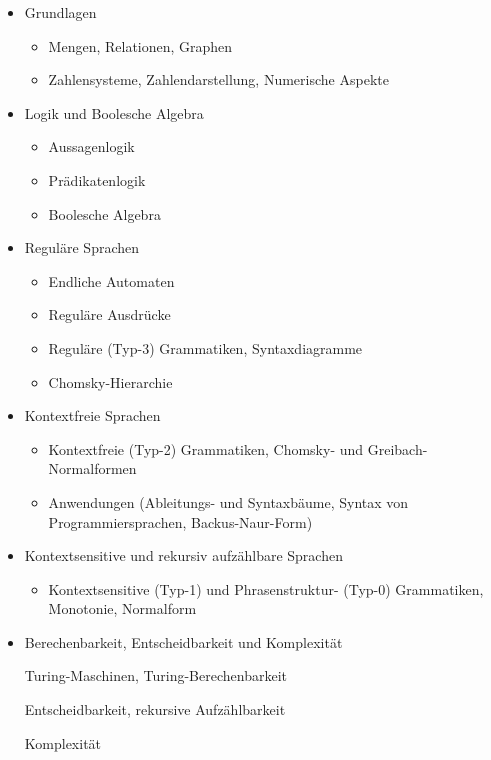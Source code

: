 \begin{itemize}
\tightlist
\item
  Grundlagen

  \begin{itemize}
\tightlist
\item
    Mengen, Relationen, Graphen
  \item
    Zahlensysteme, Zahlendarstellung, Numerische Aspekte
  \end{itemize}
\item
  Logik und Boolesche Algebra

  \begin{itemize}
\tightlist
\item
    Aussagenlogik
  \item
    Prädikatenlogik
  \item
    Boolesche Algebra
  \end{itemize}
\item
  Reguläre Sprachen

  \begin{itemize}
\tightlist
\item
    Endliche Automaten
  \item
    Reguläre Ausdrücke
  \item
    Reguläre (Typ-3) Grammatiken, Syntaxdiagramme
  \item
    Chomsky-Hierarchie
  \end{itemize}
\item
  Kontextfreie Sprachen

  \begin{itemize}
\tightlist
\item
    Kontextfreie (Typ-2) Grammatiken, Chomsky- und Greibach-Normalformen
  \item
    Anwendungen (Ableitungs- und Syntaxbäume, Syntax von
    Programmiersprachen, Backus-Naur-Form)
  \end{itemize}
\item
  Kontextsensitive und rekursiv aufzählbare Sprachen

  \begin{itemize}
\tightlist
\item
    Kontextsensitive (Typ-1) und Phrasenstruktur- (Typ-0) Grammatiken,
    Monotonie, Normalform
  \end{itemize}
\item
  Berechenbarkeit, Entscheidbarkeit und Komplexität

  Turing-Maschinen, Turing-Berechenbarkeit

  Entscheidbarkeit, rekursive Aufzählbarkeit

  Komplexität
\end{itemize}

